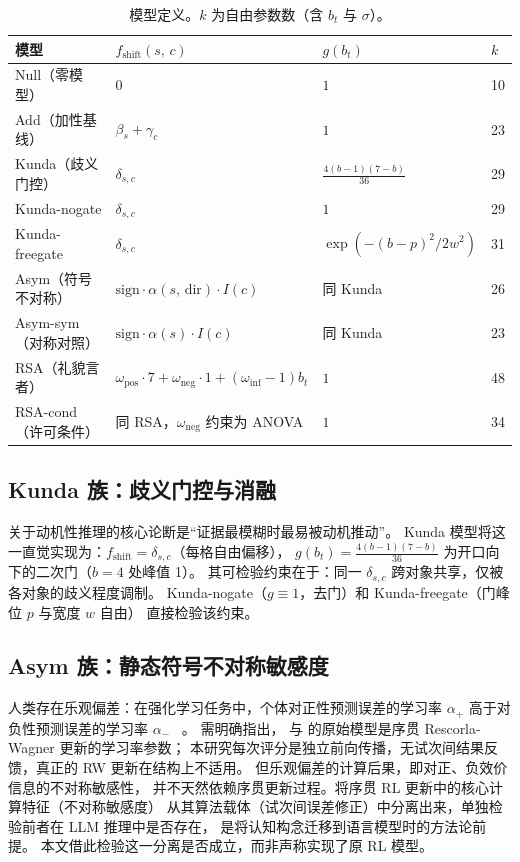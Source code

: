 \documentclass[11pt,a4paper]{ctexart}
\begin{document}
\begin{table}[t]
\centering\small
\caption{模型定义。$k$ 为自由参数数（含 $b_t$ 与 $\sigma$）。}
\label{tab:models}
\begin{tabular}{llll}
\toprule
模型 & $f_{\text{shift}}(s,\,c)$ & $g(b_t)$ & $k$ \\
\midrule
Null（零模型） & $0$ & $1$ & 10 \\
Add（加性基线） & $\beta_s + \gamma_c$ & $1$ & 23 \\
Kunda（歧义门控） & $\delta_{s,c}$ & $\frac{4(b-1)(7-b)}{36}$ & 29 \\
Kunda-nogate & $\delta_{s,c}$ & $1$ & 29 \\
Kunda-freegate & $\delta_{s,c}$ & $\exp(-(b-p)^2 / 2w^2)$ & 31 \\
Asym（符号不对称） & $\mathrm{sign}\cdot\alpha(s,\,\mathrm{dir})\cdot I(c)$ & 同 Kunda & 26 \\
Asym-sym（对称对照） & $\mathrm{sign}\cdot\alpha(s)\cdot I(c)$ & 同 Kunda & 23 \\
RSA（礼貌言者） & $\omega_{\text{pos}}\!\cdot\!7 + \omega_{\text{neg}}\!\cdot\!1 + (\omega_{\text{inf}}\!-\!1)b_t$ & $1$ & 48 \\
RSA-cond（许可条件） & 同 RSA，$\omega_{\text{neg}}$ 约束为 ANOVA & $1$ & 34 \\
\bottomrule
\end{tabular}
\end{table}

\subsection{Kunda 族：歧义门控与消融}

\citet{kunda1990motivated} 关于动机性推理的核心论断是``证据最模糊时最易被动机推动''。
Kunda 模型将这一直觉实现为：$f_{\text{shift}} = \delta_{s,c}$（每格自由偏移），
$g(b_t) = \tfrac{4(b-1)(7-b)}{36}$ 为开口向下的二次门（$b=4$ 处峰值 1）。
其可检验约束在于：同一 $\delta_{s,c}$ 跨对象共享，仅被各对象的歧义程度调制。
Kunda-nogate（$g \equiv 1$，去门）和 Kunda-freegate（门峰位 $p$ 与宽度 $w$ 自由）
直接检验该约束。

\subsection{Asym 族：静态符号不对称敏感度}

人类存在乐观偏差：在强化学习任务中，个体对正性预测误差的学习率 $\alpha_+$
高于对负性预测误差的学习率 $\alpha_-$
~\citep{sharot2011optimism,lefebvre2017asymmetric}。
需明确指出，\citet{sharot2011optimism} 与 \citet{lefebvre2017asymmetric}
的原始模型是序贯 Rescorla-Wagner 更新的学习率参数；
本研究每次评分是独立前向传播，无试次间结果反馈，真正的 RW 更新在结构上不适用。
但乐观偏差的计算后果，即对正、负效价信息的不对称敏感性，
并不天然依赖序贯更新过程。将序贯 RL 更新中的核心计算特征（不对称敏感度）
从其算法载体（试次间误差修正）中分离出来，单独检验前者在 LLM 推理中是否存在，
是将认知构念迁移到语言模型时的方法论前提。
本文借此检验这一分离是否成立，而非声称实现了原 RL 模型。
\end{document}
